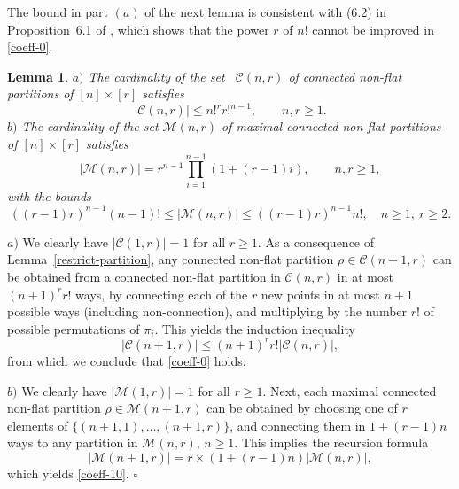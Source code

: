 \documentclass[12pt]{article}
\newtheorem{lemma}[prop]{Lemma}
\newenvironment{Proof}{\removelastskip\par\medskip
\noindent{\em Proof.} \rm}{\penalty-20\null\hfill$\square$\par\medbreak}
\numberwithin{equation}{section}
\begin{document}
\noindent
 The bound in part $(a)$ of the next lemma is consistent with
 (6.2) in Proposition~6.1 of \cite{schulte-thaele},
 which shows that the power $r$ of $n!$ cannot be improved in \eqref{coeff-0}. 
\begin{lemma}
  \label{fjkldsf-l}
  \noindent
  $a)$ The cardinality of the set \ $\mathcal{C} (n,r)$
 of connected non-flat partitions of $[n]\times[r]$ satisfies 
 \begin{equation}
   \label{coeff-0}
  |\mathcal{C} (n,r) | \leq n!^r r!^{n-1}, 
  \qquad n,r \geq 1. 
\end{equation}
\noindent
$b)$ 
 The cardinality of the set 
$ \mathcal{M}(n,r)$
 of maximal connected non-flat partitions of $[n]\times[r]$ satisfies 
\begin{equation}\label{coeff-10}
  |\mathcal{M}(n,r)|=r^{n-1}\prod_{i=1}^{n-1}(1+(r-1)i),
  \qquad n,r\geq 1, 
\end{equation}
 with the bounds 
\begin{equation}\label{coeff-1}
    ( (r-1)r )^{n-1}(n-1)!\le
    |\mathcal{M}(n,r)|
     \leq ( (r-1)r )^{n-1}n!, \quad n\geq 1, \ r\geq 2. 
\end{equation}
\end{lemma}
\begin{Proof}
\noindent
 $a)$ We clearly have $|\mathcal{C} (1,r) | =1$ for all $r\geq 1$. 
 As a consequence of Lemma~\ref{restrict-partition}, 
 any connected non-flat partition $\rho \in \mathcal{C}(n+1,r)$ can be
 obtained from a connected non-flat partition in $\mathcal{C}(n,r)$ in at most
 $(n+1)^r r!$ ways, by connecting each of the $r$ new points
 in at most $n+1$ possible ways (including non-connection),
 and multiplying by the number $r!$ of possible permutations of $\pi_i$. 
 This yields the induction inequality 
 $$
 |\mathcal{C} (n+1,r) | \leq (n+1)^r r! |\mathcal{C} (n,r) |,
 $$
 from which we conclude that \eqref{coeff-0} holds. 
 
 \medskip 

 \noindent
 $b)$ 
 We clearly have $|\mathcal{M}(1,r)|=1$ for all $r\geq 1$. 
 Next, each maximal connected non-flat partition 
 $\rho\in\mathcal{M}(n+1,r)$ can be
   obtained by choosing 
   one of $r$ elements of $\{(n+1,1),\dots,(n+1,r)\}$, 
   and connecting them in $1+(r-1)n$ ways 
   to any partition in $\mathcal{M}(n,r)$, $n\geq 1$.
   This implies the recursion formula 
   $$|\mathcal{M}(n+1,r)|=r\times (1+(r-1)n)|\mathcal{M}(n,r)|,
   $$
 which yields \eqref{coeff-10}.
\end{Proof} 
\end{document}
